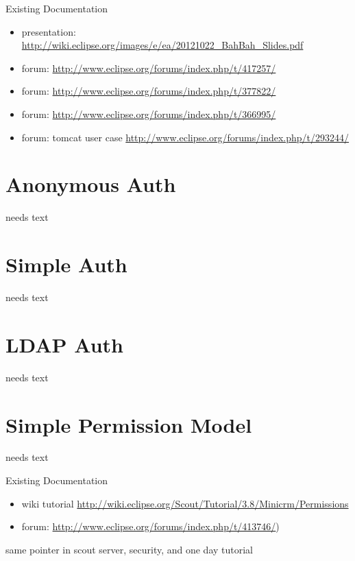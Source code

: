 \documentclass[a4paper,10pt,twoside]{book}
\begin{document}
\noindent Existing Documentation
\begin{itemize}
  \item presentation: \url{http://wiki.eclipse.org/images/e/ea/20121022_BahBah_Slides.pdf}
  \item forum: \url{http://www.eclipse.org/forums/index.php/t/417257/}
  \item forum: \url{http://www.eclipse.org/forums/index.php/t/377822/}
  \item forum: \url{http://www.eclipse.org/forums/index.php/t/366995/}
  \item forum: tomcat user case \url{http://www.eclipse.org/forums/index.php/t/293244/}
\end{itemize}

\section{Anonymous Auth}
needs text

\section{Simple Auth}
needs text

\section{LDAP Auth}
needs text

\section{Simple Permission Model}
needs text

\noindent Existing Documentation
\begin{itemize}
  \item wiki tutorial \url{http://wiki.eclipse.org/Scout/Tutorial/3.8/Minicrm/Permissions}
  \item forum: \url{http://www.eclipse.org/forums/index.php/t/413746/})
\end{itemize}

same pointer in scout server, security, and one day tutorial


\end{document}

